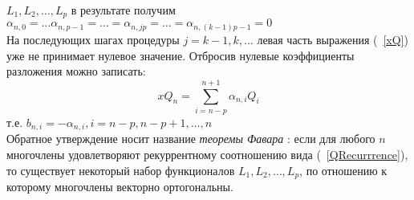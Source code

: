$L_1,L_2,\ldots,L_p$ в результате получим
$\alpha_{n,0}=\ldots\alpha_{n,p-1}=\ldots=\alpha_{n,jp}=\ldots=\alpha_{n,(k-1)p-1}=0$ \\
На последующих шагах процедуры $j=k-1,k,\ldots$ левая часть
выражения (~\ref{xQ}) уже не принимает нулевое значение. Отбросив
нулевые коэффициенты разложения можно записать:
$$
xQ_n=\sum\limits_{i=n-p}^{n+1}{\alpha_{n,i}Q_i}
$$
т.е. $b_{n,i}=-\alpha_{n,i},i=n-p,n-p+1,\ldots,n$ \\ Обратное
утверждение носит название \textit{теоремы Фавара} : если для
любого $n$ многочлены удовлетворяют рекуррентному соотношению вида
(~\ref{QRecurrrence}), то существует некоторый набор функционалов
$L_1,L_2,\ldots,L_p$, по отношению к которому многочлены векторно
ортогональны.\\ \\
